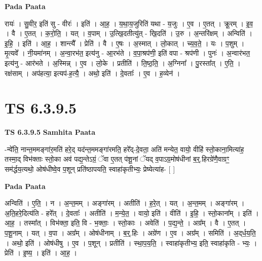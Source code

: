 \documentclass[17pt]{extarticle}
\begin{document}
\textbf{Pada Paata} \newline

रायः॑ । सु॒वीर॒ इति॑ सु - वीरः॑ । इति॑ । आ॒ह॒ । य॒था॒य॒जुरिति॑ यथा - य॒जुः । ए॒व । ए॒तत् । क्रू॒रम् । इ॒व॒ । वै । ए॒तत् । क॒रो॒ति॒ । यत् । व॒पाम् । उ॒त्खि॒दतीत्यु॑त् - खि॒दति॑ । उ॒रु । अ॒न्तरि॑क्षम् । अन्विति॑ । इ॒हि॒ । इति॑ । आ॒ह॒ । शान्त्यै᳚ । प्रेति॑ । वै । ए॒षः । अ॒स्मात् । लो॒कात् । च्य॒व॒ते॒ । यः । प॒शुम् । मृ॒त्यवे᳚ । नी॒यमा॑नम् । अ॒न्वा॒रभ॑त॒ इत्य॑नु - आ॒रभ॑ते । व॒पा॒श्रप॑णी॒ इति॑ वपा - श्रप॑णी । पुनः॑ । अ॒न्वार॑भत॒ इत्य॑नु - आर॑भते । अ॒स्मिन्न् । ए॒व । लो॒के । प्रतीति॑ । ति॒ष्ठ॒ति॒ । अ॒ग्निना᳚ । पु॒रस्ता᳚त् । ए॒ति॒ । रक्ष॑साम् । अप॑हत्या॒ इत्यप॑-ह॒त्यै॒ । अथो॒ इति॑ । दे॒वताः᳚ । ए॒व । ह॒व्येन॑ ।  \newline




\section*{ TS 6.3.9.5 }

\textbf{TS 6.3.9.5 } \newline
\textbf{Samhita Paata} \newline

-न्वे॑ति॒ नान्त॒ममङ्गा॑र॒मति॑ हरे॒द् यद॑न्त॒ममङ्गा॑रमति॒ हरे᳚द्-दे॒वता॒ अति॑ मन्येत॒ वायो॒ वीहि॑ स्तो॒काना॒मित्या॑ह॒ तस्मा॒द् विभ॑क्ताः स्तो॒का अव॑ पद्य॒न्तेऽग्रं॒ ॅवा ए॒तत् प॑शू॒नां ॅयद् व॒पाऽग्र॒मोष॑धीनां ब॒र्॒.हिरग्रे॑णै॒वाग्रꣳ॒॒ सम॑र्द्धय॒त्यथो॒ ओष॑धीष्वे॒व प॒शून् प्रति॑ष्ठापयति॒ स्वाहा॑कृतीभ्यः॒ प्रेष्येत्या॑ह- [  ] \newline

\textbf{Pada Paata} \newline

अन्विति॑ । ए॒ति॒ । न । अ॒न्त॒मम् । अङ्गा॑रम् । अतीति॑ । ह॒रे॒त् । यत् । अ॒न्त॒मम् । अङ्गा॑रम् । अ॒ति॒हरे॒दित्य॑ति - हरे᳚त् । दे॒वताः᳚ । अतीति॑ । म॒न्ये॒त॒ । वायो॒ इति॑ । वीति॑ । इ॒हि॒ । स्तो॒काना᳚म् । इति॑ । आ॒ह॒ । तस्मा᳚त् । विभ॑क्ता॒ इति॒ वि - भ॒क्ताः॒ । स्तो॒काः । अवेति॑ । प॒द्य॒न्ते॒ । अग्र᳚म् । वै । ए॒तत् । प॒शू॒नाम् । यत् । व॒पा । अग्र᳚म् । ओष॑धीनाम् । ब॒र्॒.हिः । अग्रे॑ण । ए॒व । अग्र᳚म् । समिति॑ । अ॒द्‌र्ध॒य॒ति॒ । अथो॒ इति॑ । ओष॑धीषु । ए॒व । प॒शून् । प्रतीति॑ । स्था॒प॒य॒ति॒ । स्वाहा॑कृतीभ्य॒ इति॒ स्वाहा॑कृति - भ्यः॒ । प्रेति॑ । इ॒ष्य॒ । इति॑ । आ॒ह॒ ।  \newline




\end{document}
